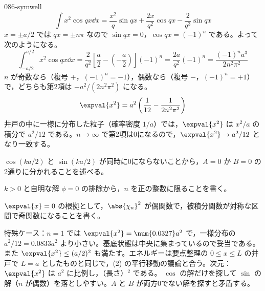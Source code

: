 \documentclass[uplatex,dvipdfmx,a4paper,11pt]{jsarticle}
\begin{document}
\begin{kaisetsu}{086-symwell}
\[ \int x^{2}\cos qx\dd x=\frac{x^{2}}{q}\sin qx+\frac{2x}{q^{2}}\cos qx-\frac{2}{q^{3}}\sin qx \]
$x=\pm a/2$ では $qx=\pm n\pi$ なので $\sin qx=0$，$\cos qx=(-1)^{n}$ である。よって次のようになる。
\[ \int_{-a/2}^{a/2}x^{2}\cos qx\dd x=\frac{2}{q^{2}}\left[\frac{a}{2}-\left(-\frac{a}{2}\right)\right](-1)^{n}=\frac{2a}{q^{2}}(-1)^{n}=\frac{(-1)^{n}a^{3}}{2n^{2}\pi^{2}} \]
$n$ が奇数なら（複号 $+$，$(-1)^{n}=-1$），偶数なら（複号 $-$，$(-1)^{n}=+1$）で，どちらも第2項は $-a^{2}/(2n^{2}\pi^{2})$ になる。
\[ \expval{x^{2}}=a^{2}\left(\frac{1}{12}-\frac{1}{2n^{2}\pi^{2}}\right) \]
井戸の中に一様に分布した粒子（確率密度 $1/a$）では，$\expval{x^{2}}$ は $x^{2}/a$ の積分で $a^{2}/12$ である。$n\to\infty$ で第2項は0になるので，$\expval{x^{2}}\to a^{2}/12$ となり一致する。
\begin{ronten}
  \item {} $\cos(ka/2)$ と $\sin(ka/2)$ が同時に0にならないことから，$A=0$ か $B=0$ の2通りに分かれることを述べる。
  \item {} $k>0$ と自明な解 $\phi=0$ の排除から，$n$ を正の整数に限ることを書く。
  \item {} $\expval{x}=0$ の根拠として，$\abs{\chi_{n}}^{2}$ が偶関数で，被積分関数が対称な区間で奇関数になることを書く。
\end{ronten}
\kenzan 特殊ケース：$n=1$ では $\expval{x^{2}}=\num{0.0327}a^{2}$ で，一様分布の $a^{2}/12=\num{0.0833}a^{2}$ より小さい。基底状態は中央に集まっているので妥当である。また $\expval{x^{2}}\le(a/2)^{2}$ も満たす。エネルギーは要点整理の $0\le x\le L$ の井戸で $L=a$ としたものと同じで，(2) の平行移動の議論と合う。次元：$\expval{x^{2}}$ は $a^{2}$ に比例し，（長さ）$^{2}$ である。
\tsumazuki $\cos$ の解だけを探して $\sin$ の解（$n$ が偶数）を落としやすい。$A$ と $B$ が両方0でない解を探すと矛盾する。
\end{kaisetsu}
\end{document}
